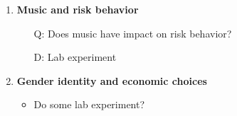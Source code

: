 \documentclass[12pt]{article}
\begin{document}
\begin{enumerate}
	\item \textbf{Music and risk behavior}
		\begin{itemize}
			\item[Q:] Does music have impact on risk behavior?
			\item[D:] Lab experiment 
		\end{itemize}
	
	\item \textbf{Gender identity and economic choices}
		\begin{itemize}
			\item Do some lab experiment?
		\end{itemize}






\end{enumerate}
\end{document}
